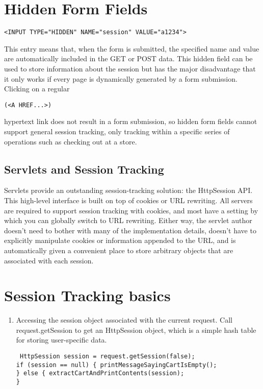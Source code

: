 \documentclass[a4paper,10pt]{scrreprt}
\begin{document}
{\section{Hidden Form Fields}
\begin{verbatim}
<INPUT TYPE="HIDDEN" NAME="session" VALUE="a1234"> 
\end{verbatim}
This entry means that, when the form is submitted, the specified name and value are automatically included in the
GET or POST data. This hidden field can be used to store information about the session but has the major
disadvantage that it only works if every page is dynamically generated by a form submission. Clicking on a regular
\begin{verbatim}
(<A HREF...>) 
\end{verbatim}
 hypertext link does not result in a form submission, so hidden form fields cannot support 
general
session tracking, only tracking within a specific series of operations such as checking out at a store.
\subsection{Servlets and Session Tracking}
Servlets provide an outstanding session-tracking solution: the HttpSession API. This high-level interface is built on
top of cookies or URL rewriting. All servers are required to support session tracking with cookies, and most have a
setting by which you can globally switch to URL rewriting.
Either way, the servlet author doesn’t need to bother with many of the implementation details, doesn’t have to
explicitly manipulate cookies or information appended to the URL, and is automatically given a convenient place to
store arbitrary objects that are associated with each session.

\section{Session Tracking basics}
\begin{enumerate}

\item Accessing the session object associated with the current request. Call
request.getSession to get an HttpSession object, which is a simple hash table for
storing user-specific data. 
\begin{lstlisting}
 HttpSession session = request.getSession(false);
if (session == null) { printMessageSayingCartIsEmpty();
} else { extractCartAndPrintContents(session);
}
\end{lstlisting}


\end{enumerate}}
\end{document}
